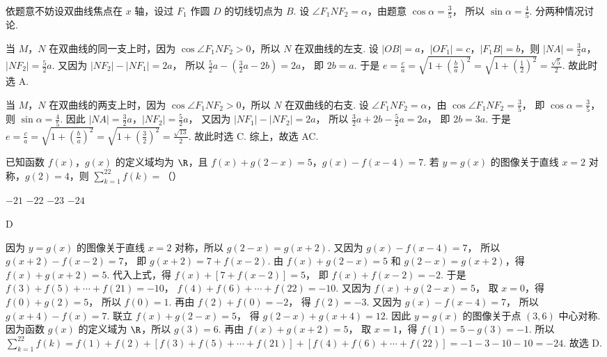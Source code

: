 \begin{solution}
依题意不妨设双曲线焦点在 \(x\) 轴，设过 \(F_1\) 作圆 \(D\) 的切线切点为 \(B\).
设 \(\angle F_1NF_2=\alpha\)，由题意
\(\cos \alpha=\frac{3}{5}\)，
所以
\(\sin \alpha=\frac{4}{5}\).
分两种情况讨论.

当 \(M\)，\(N\) 在双曲线的同一支上时，因为 \(\cos \angle F_1NF_2>0\)，所以 \(N\) 在双曲线的左支.
设 \(|OB|=a\)，\(|OF_1|=c\)，\(|F_1B|=b\)，则
\(|NA|=\frac{3}{2}a\)，\(|NF_2|=\frac{5}{2}a\).
又因为
\(|NF_2|-|NF_1|=2a\)，
所以
\(\frac{5}{2}a-\left( \frac{3}{2}a-2b \right)=2a\)，
即
\(2b=a\).
于是 \(e=\frac{c}{a}=\sqrt{1+\left( \frac{b}{a} \right)^2}=\sqrt{1+\left( \frac{1}{2} \right)^2}=\frac{\sqrt{5}}{2}\).
故此时选 A.

当 \(M\)，\(N\) 在双曲线的两支上时，因为 \(\cos \angle F_1NF_2>0\)，所以 \(N\) 在双曲线的右支.
设 \(\angle F_1NF_2=\alpha\)，由
\(\cos \angle F_1NF_2=\frac{3}{5}\)，
即
\(\cos \alpha=\frac{3}{5}\)，
则
\(\sin \alpha=\frac{4}{5}\).
因此
\(|NA|=\frac{3}{2}a\)，\(|NF_2|=\frac{5}{2}a\)，
又因为
\(|NF_1|-|NF_2|=2a\)，
所以
\(\frac{3}{2}a+2b-\frac{5}{2}a=2a\)，
即
\(2b=3a\).
于是 \(e=\frac{c}{a}=\sqrt{1+\left( \frac{b}{a} \right)^2}=\sqrt{1+\left( \frac{3}{2} \right)^2}=\frac{\sqrt{13}}{2}\).
故此时选 C.
综上，故选 AC.
\end{solution}

\begin{problem}
已知函数 \(f(x)\)，\(g(x)\) 的定义域均为 \(\R\)，且 \(f(x)+g(2-x)=5\)，\(g(x)-f(x-4)=7\). 若 \(y=g(x)\) 的图像关于直线 \(x=2\) 对称，\(g(2)=4\)，则 \(\sum_{k=1}^{22}f(k)=\)（\quad）

\choices
    {\(-21\)}
    {\(-22\)}
    {\(-23\)}
    {\(-24\)}
\end{problem}

\begin{answer}
D
\end{answer}

\begin{solution}
因为 \(y=g(x)\) 的图像关于直线 \(x=2\) 对称，所以
\(g(2-x)=g(x+2)\).
又因为
\(g(x)-f(x-4)=7\)，
所以
\(g(x+2)-f(x-2)=7\)，
即
\(g(x+2)=7+f(x-2)\).
由
\(f(x)+g(2-x)=5\)
和 \(g(2-x)=g(x+2)\)，得
\(f(x)+g(x+2)=5\).
代入上式，得
\(f(x)+\left[ 7+f(x-2) \right]=5\)，
即
\(f(x)+f(x-2)=-2\).
于是
\(f(3)+f(5)+\cdots+f(21)=-10\)，
\(f(4)+f(6)+\cdots+f(22)=-10\).
又因为
\(f(x)+g(2-x)=5\)，
取 \(x=0\)，得
\(f(0)+g(2)=5\)，
所以
\(f(0)=1\).
再由
\(f(2)+f(0)=-2\)，
得
\(f(2)=-3\).
又因为
\(g(x)-f(x-4)=7\)，
所以
\(g(x+4)-f(x)=7\).
联立
\(f(x)+g(2-x)=5\)，
得
\(g(2-x)+g(x+4)=12\).
因此 \(y=g(x)\) 的图像关于点 \((3,6)\) 中心对称.
因为函数 \(g(x)\) 的定义域为 \(\R\)，所以
\(g(3)=6\).
再由
\(f(x)+g(x+2)=5\)，
取 \(x=1\)，得
\(f(1)=5-g(3)=-1\).
所以 \(\sum_{k=1}^{22}f(k) =f(1)+f(2)+\left[ f(3)+f(5)+\cdots+f(21) \right]+\left[ f(4)+f(6)+\cdots+f(22) \right]=-1-3-10-10=-24\).
故选 D.
\end{solution}

